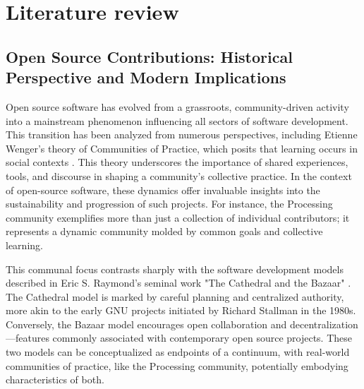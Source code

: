\documentclass[draft]{article}
\begin{document}



\section{Literature review}
\subsection{Open Source Contributions: Historical Perspective and Modern Implications}

Open source software has evolved from a grassroots, community-driven activity into a mainstream phenomenon influencing all sectors of software development. This transition has been analyzed from numerous perspectives, including Etienne Wenger's theory of Communities of Practice, which posits that learning occurs in social contexts \parencite{wengerCommunitiesPracticeLearning1998}. This theory underscores the importance of shared experiences, tools, and discourse in shaping a community's collective practice. In the context of open-source software, these dynamics offer invaluable insights into the sustainability and progression of such projects. For instance, the Processing community exemplifies more than just a collection of individual contributors; it represents a dynamic community molded by common goals and collective learning.

This communal focus contrasts sharply with the software development models described in Eric S. Raymond's seminal work "The Cathedral and the Bazaar" \parencite{CathedralBazaarMusings2002a}. The Cathedral model is marked by careful planning and centralized authority, more akin to the early GNU projects initiated by Richard Stallman in the 1980s. Conversely, the Bazaar model encourages open collaboration and decentralization—features commonly associated with contemporary open source projects. These two models can be conceptualized as endpoints of a continuum, with real-world communities of practice, like the Processing community, potentially embodying characteristics of both.
\end{document}
